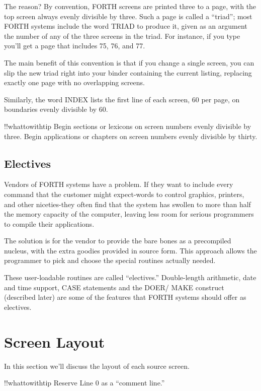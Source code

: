 The reason? By convention, FORTH screens are printed three to a
page, with the top screen always evenly divisible by three.  Such a page is
called a ``triad''; most FORTH systems include the word TRIAD to
produce it, given as an argument the number of any of the three screens
in the triad.  For instance, if you type
you'll get a page that includes 75, 76, and 77.

The main benefit of this convention is that if you change a single
screen, you can slip the new triad right into your binder containing the
current listing, replacing exactly one page with no overlapping screens.

Similarly, the word INDEX lists the first line of each screen, 60 per
page, on boundaries evenly divisible by 60.

!!whattowithtip{
Begin sections or lexicons on screen numbers evenly divisible by three.
Begin applications or chapters on screen numbers evenly divisible by
thirty.
}

\subsection{Electives}

Vendors of FORTH systems have a problem.  If they want to include
every command that the customer might expect-words to control
graphics, printers, and other niceties-they often find that the system
has swollen to more than half the memory capacity of the computer, leaving
less room for serious programmers to compile their applications.

The solution is for the vendor to provide the bare bones as a precompiled
nucleus, with the extra goodies provided in source form.  This approach
allows the programmer to pick and choose the special routines
actually needed.

These user-loadable routines are called ``electives.'' Double-length
arithmetic, date and time support, CASE statements and the DOER/
MAKE construct (described later) are some of the features that FORTH
systems should offer as electives.

\section{Screen Layout}

In this section we'll discuss the layout of each source screen.

!!whattowithtip{
Reserve Line 0 as a ``comment line.''
}

